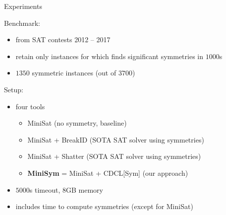 \documentclass{beamer}
\begin{document}
\begin{frame}{Experiments}

Benchmark:
\begin{itemize}
	\item from SAT contests 2012 -- 2017
	\item retain only instances for which \bliss{} finds significant symmetries in $1000$s
	\item $1350$ symmetric instances (out of $3700$)
\end{itemize}

Setup:
\begin{itemize}
	\item four tools
	\begin{itemize}
		\item MiniSat (no symmetry, baseline)
		\item MiniSat + BreakID (SOTA SAT solver using symmetries)
		\item MiniSat + Shatter (SOTA SAT solver using symmetries)
		\item \textbf{MiniSym} = MiniSat + CDCL[Sym] (our approach)
	\end{itemize}
	\item $5000$s timeout, $8$GB memory
	\item includes time to compute symmetries (except for MiniSat)
\end{itemize}

\end{frame}
\end{document}
